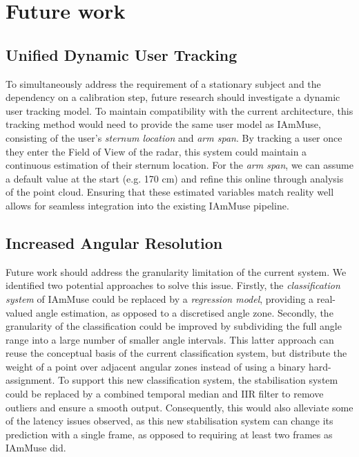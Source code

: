 \section{Future work}
\label{section: conclusion - future work}

\subsection*{Unified Dynamic User Tracking}
To simultaneously address the requirement of a stationary subject and the dependency on a calibration step, future research should investigate a dynamic user tracking model.
To maintain compatibility with the current architecture, this tracking method would need to provide the same user model as IAmMuse, consisting of the user's \textit{sternum location} and \textit{arm span}.
By tracking a user once they enter the Field of View of the radar, this system could maintain a continuous estimation of their sternum location.
For the \textit{arm span}, we can assume a default value at the start (e.g. 170 cm) and refine this online through analysis of the point cloud.
Ensuring that these estimated variables match reality well allows for seamless integration into the existing IAmMuse pipeline.


\subsection*{Increased Angular Resolution}
Future work should address the granularity limitation of the current system.
We identified two potential approaches to solve this issue.
Firstly, the \textit{classification system} of IAmMuse could be replaced by a \textit{regression model}, providing a real-valued angle estimation, as opposed to a discretised angle zone.
Secondly, the granularity of the classification could be improved by subdividing the full angle range into a large number of smaller angle intervals.
This latter approach can reuse the conceptual basis of the current classification system, but distribute the weight of a point over adjacent angular zones instead of using a binary hard-assignment.
To support this new classification system, the stabilisation system could be replaced by a combined temporal median and IIR filter to remove outliers and ensure a smooth output.
Consequently, this would also alleviate some of the latency issues observed, as this new stabilisation system can change its prediction with a single frame, as opposed to requiring at least two frames as IAmMuse did.

